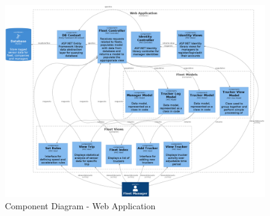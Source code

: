 \begin{figure}[H]
\centering
\includegraphics[width=6in]{../diag/webapp_component.png}
\caption{Component Diagram - Web Application}
\label{fig:webapp_component}
\end{figure}

